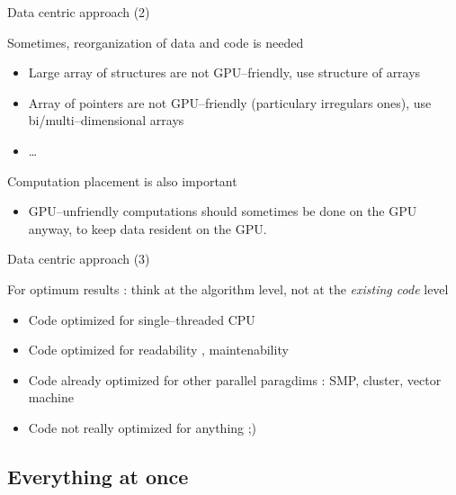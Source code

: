 \documentclass{beamer}
\begin{document}
\begin{frame}{Data centric approach (2)}

Sometimes, reorganization of data and code is needed
\begin{itemize}
\item Large array of structures are not GPU--friendly, use structure of
  arrays
\item Array of pointers are not GPU--friendly (particulary irregulars ones),
  use bi/multi--dimensional arrays
\item \ldots
\end{itemize}
Computation placement is also important
\begin{itemize}
\item GPU--unfriendly computations should sometimes be done on the GPU
  anyway, to keep data resident on the GPU.
\end{itemize}
\end{frame}

\begin{frame}{Data centric approach (3)}

  For optimum results : think at the algorithm level, not  at the
  \textsl{existing code} level
  \begin{itemize}
  \item Code optimized for single--threaded CPU
  \item Code optimized for readability , maintenability
  \item Code already optimized for other parallel paragdims :
    SMP, cluster, vector machine
  \item Code not really optimized for anything ;)
  \end{itemize}
\end{frame}

\subsection{Everything at once}
\end{document}
